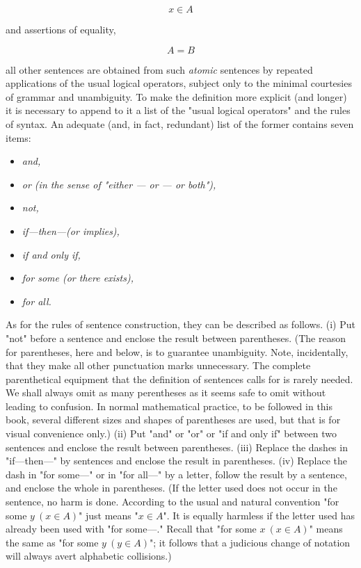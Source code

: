 \begin{equation*}
x \in A
\end{equation*}

and assertions of equality, 

\begin{equation*}
A = B
\end{equation*}

all other sentences are obtained from such \textit{atomic} sentences by repeated applications of the usual logical operators, subject only to the minimal courtesies of grammar and unambiguity. To make the definition more explicit (and longer) it is necessary to append to it a list of the "usual logical operators" and the rules of syntax. An adequate (and, in fact, redundant) list of the former contains seven items:

\begin{itemize}[label={}]
  \itemsep0em
  \item \textit{and,}
  \item \textit{or (in the sense of "either — or — or both"), }
  \item \textit{not,}
  \item \textit{if—then—(or implies),}
  \item \textit{if and only if,}
  \item \textit{for some (or there exists),}
  \item \textit{for all.}
\end{itemize}

As for the rules of sentence construction, they can be described as follows. (i) Put "not" before a sentence and enclose the result between parentheses. (The reason for parentheses, here and below, is to guarantee unambiguity. Note, incidentally, that they make all other punctuation marks unnecessary. The complete parenthetical equipment that the definition of sentences calls for is rarely needed. We shall always omit as many perentheses as it seems safe to omit without leading to confusion. In normal mathematical practice, to be followed in this book, several different sizes and shapes of parentheses are used, but that is for visual convenience only.) (ii) Put "and" or "or" or "if and only if" between two sentences and enclose the result between parentheses. (iii) Replace the dashes in "if—then—" by sentences and enclose the result in parentheses. (iv) Replace the dash in "for some—" or in "for all—" by a letter, follow the result by a sentence, and enclose the whole in parentheses. (If the letter used does not occur in the sentence, no harm is done. According to the usual and natural convention "for some $y\ (x \in A)$" just means "$ x \in A$". It is equally harmless if the letter used has already been used with "for some—." Recall that "for some $x\ (x \in A)$" means the same as  "for some $y\ (y \in A)$"; it follows that a judicious change of notation will always avert alphabetic collisions.)

